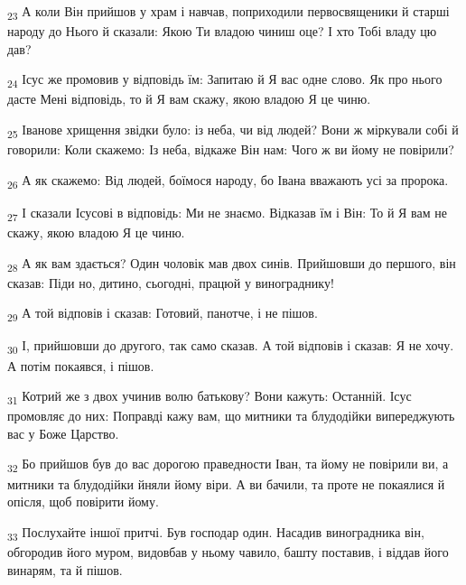 \begin{tcolorbox}
\textsubscript{23} А коли Він прийшов у храм і навчав, поприходили первосвященики й старші народу до Нього й сказали: Якою Ти владою чиниш оце? І хто Тобі владу цю дав?
\end{tcolorbox}
\begin{tcolorbox}
\textsubscript{24} Ісус же промовив у відповідь їм: Запитаю й Я вас одне слово. Як про нього дасте Мені відповідь, то й Я вам скажу, якою владою Я це чиню.
\end{tcolorbox}
\begin{tcolorbox}
\textsubscript{25} Іванове хрищення звідки було: із неба, чи від людей? Вони ж міркували собі й говорили: Коли скажемо: Із неба, відкаже Він нам: Чого ж ви йому не повірили?
\end{tcolorbox}
\begin{tcolorbox}
\textsubscript{26} А як скажемо: Від людей, боїмося народу, бо Івана вважають усі за пророка.
\end{tcolorbox}
\begin{tcolorbox}
\textsubscript{27} І сказали Ісусові в відповідь: Ми не знаємо. Відказав їм і Він: То й Я вам не скажу, якою владою Я це чиню.
\end{tcolorbox}
\begin{tcolorbox}
\textsubscript{28} А як вам здається? Один чоловік мав двох синів. Прийшовши до першого, він сказав: Піди но, дитино, сьогодні, працюй у винограднику!
\end{tcolorbox}
\begin{tcolorbox}
\textsubscript{29} А той відповів і сказав: Готовий, панотче, і не пішов.
\end{tcolorbox}
\begin{tcolorbox}
\textsubscript{30} І, прийшовши до другого, так само сказав. А той відповів і сказав: Я не хочу. А потім покаявся, і пішов.
\end{tcolorbox}
\begin{tcolorbox}
\textsubscript{31} Котрий же з двох учинив волю батькову? Вони кажуть: Останній. Ісус промовляє до них: Поправді кажу вам, що митники та блудодійки випереджують вас у Боже Царство.
\end{tcolorbox}
\begin{tcolorbox}
\textsubscript{32} Бо прийшов був до вас дорогою праведности Іван, та йому не повірили ви, а митники та блудодійки йняли йому віри. А ви бачили, та проте не покаялися й опісля, щоб повірити йому.
\end{tcolorbox}
\begin{tcolorbox}
\textsubscript{33} Послухайте іншої притчі. Був господар один. Насадив виноградника він, обгородив його муром, видовбав у ньому чавило, башту поставив, і віддав його винарям, та й пішов.
\end{tcolorbox}

